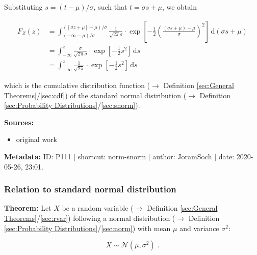 \documentclass[a4paper,12pt,twoside]{book}
\begin{document}
Substituting $s = (t - \mu)/\sigma$, such that $t = \sigma s + \mu$, we obtain

\begin{equation} \label{eq:norm-snorm-Z-cdf-s2}
\begin{split}
F_Z(z) &= \int_{(-\infty - \mu)/\sigma}^{([\sigma z + \mu] - \mu)/\sigma} \frac{1}{\sqrt{2 \pi} \sigma} \cdot \exp \left[ -\frac{1}{2} \left( \frac{(\sigma s + \mu)-\mu}{\sigma} \right)^2 \right] \, \mathrm{d}(\sigma s + \mu) \\
&= \int_{-\infty}^{z} \frac{\sigma}{\sqrt{2 \pi} \sigma} \cdot \exp \left[ -\frac{1}{2} s^2 \right] \, \mathrm{d}s \\
&= \int_{-\infty}^{z} \frac{1}{\sqrt{2 \pi}} \cdot \exp \left[ -\frac{1}{2} s^2 \right] \, \mathrm{d}s
\end{split}
\end{equation}

which is the cumulative distribution function ($\rightarrow$ Definition \ref{sec:General Theorems}/\ref{sec:cdf}) of the standard normal distribution ($\rightarrow$ Definition \ref{sec:Probability Distributions}/\ref{sec:snorm}).


\vspace{1em}
\textbf{Sources:}
\begin{itemize}
\item original work\end{itemize}


\vspace{1em}
\textbf{Metadata:} ID: P111 | shortcut: norm-snorm | author: JoramSoch | date: 2020-05-26, 23:01.
\vspace{1em}



\subsubsection[\textbf{Relation to standard normal distribution}]{Relation to standard normal distribution} \label{sec:norm-snorm2}
\setcounter{equation}{0}

\textbf{Theorem:} Let $X$ be a random variable ($\rightarrow$ Definition \ref{sec:General Theorems}/\ref{sec:rvar}) following a normal distribution ($\rightarrow$ Definition \ref{sec:Probability Distributions}/\ref{sec:norm}) with mean $\mu$ and variance $\sigma^2$:

\begin{equation} \label{eq:norm-snorm2-X-norm}
X \sim \mathcal{N}(\mu, \sigma^2) \; .
\end{equation}
\end{document}

